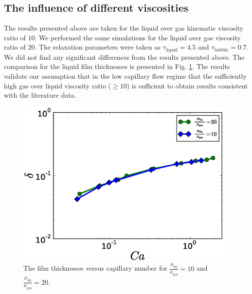 \documentclass[preprint,12pt]{elsarticle}
\begin{document}
\subsection{The influence of different viscosities}
The results presented above are taken for the liquid over gas kinematic viscosity ratio of $10$.
We performed the same simulations for the liquid over gas viscosity ratio of $20$.
The relaxation parameters were taken as $\tau_{\mathrm{liquid}}=4.5$ and $\tau_{\mathrm{bubble}}=0.7$. We
did not find any significant differences from the results presented above. The
comparison for the liquid film thicknesses is presented in Fig.
\ref{fig:capillary:viscous}. The results validate our assumption that in
the low capillary flow regime that the sufficiently high gas over liquid viscosity ratio ($\geq 10$) is sufficient to obtain results
consistent with the literature data.
\begin{figure}
\includegraphics[width=0.97\textwidth]{Figures/Capillary_Viscous/capillaries_viscous.eps}
\caption{The film thicknesses versus capillary number for
$\frac{\mu_{\mathrm{liq}}}{\mu_{\mathrm{gas}}}=10$ and $\frac{\mu_{\mathrm{liq}}}{\mu_{\mathrm{gas}}}=20$. \label{fig:capillary:viscous}}
\end{figure}
\end{document}
